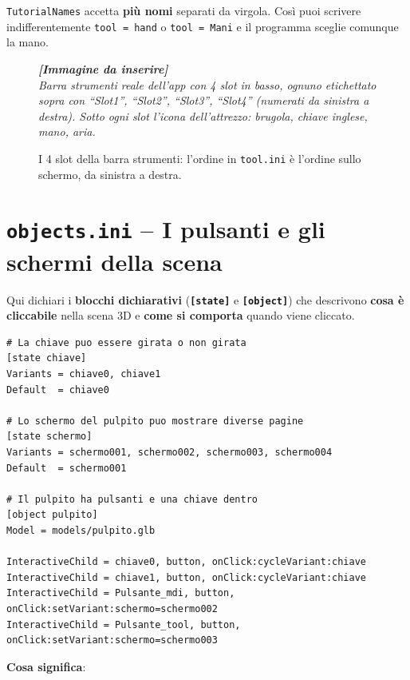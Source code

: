 ﻿\documentclass[a4paper,12pt,oneside]{book}
\newcommand{\val}[1]{\texttt{\color{cvtgreen}#1}}
\newcommand{\sez}[1]{\texttt{\color{sectioncolor}\textbf{#1}}}
\newcommand{\file}[1]{\texttt{#1}}
\newcommand{\imgph}[2]{%
  \begin{tcolorbox}[colback=cvtlightblue!30,colframe=cvtblue!40,%
    width=#1,halign=center,valign=center,height=5cm,boxrule=0.5pt,arc=3pt]%
    \textcolor{cvtgray}{\itshape\footnotesize\textbf{[Immagine da inserire]}\\[3pt]#2}%
  \end{tcolorbox}}
\begin{document}
\begin{trucchetto}
\val{TutorialNames} accetta \textbf{più nomi} separati da virgola. Così puoi
scrivere indifferentemente \texttt{tool = hand} o \texttt{tool = Mani} e il
programma sceglie comunque la mano.
\end{trucchetto}

\begin{figure}[H]
  \centering
  \imgph{12cm}{Barra strumenti reale dell'app con 4 slot in basso, ognuno etichettato sopra con ``Slot1'', ``Slot2'', ``Slot3'', ``Slot4'' (numerati da sinistra a destra). Sotto ogni slot l'icona dell'attrezzo: brugola, chiave inglese, mano, aria.}
  \caption{I 4 slot della barra strumenti: l'ordine in \file{tool.ini} è l'ordine sullo schermo, da sinistra a destra.}
  \label{fig:barra-4-slot}
\end{figure}

\section{\texttt{objects.ini} -- I pulsanti e gli schermi della scena}

Qui dichiari i \textbf{blocchi dichiarativi} (\sez{[state]} e \sez{[object]}) che
descrivono \textbf{cosa è cliccabile} nella scena 3D e \textbf{come si
comporta} quando viene cliccato.

\begin{esempiocvt}
\begin{lstlisting}
# La chiave puo essere girata o non girata
[state chiave]
Variants = chiave0, chiave1
Default  = chiave0

# Lo schermo del pulpito puo mostrare diverse pagine
[state schermo]
Variants = schermo001, schermo002, schermo003, schermo004
Default  = schermo001

# Il pulpito ha pulsanti e una chiave dentro
[object pulpito]
Model = models/pulpito.glb

InteractiveChild = chiave0, button, onClick:cycleVariant:chiave
InteractiveChild = chiave1, button, onClick:cycleVariant:chiave
InteractiveChild = Pulsante_mdi, button, onClick:setVariant:schermo=schermo002
InteractiveChild = Pulsante_tool, button, onClick:setVariant:schermo=schermo003
\end{lstlisting}
\end{esempiocvt}

\textbf{Cosa significa}:
\end{document}
